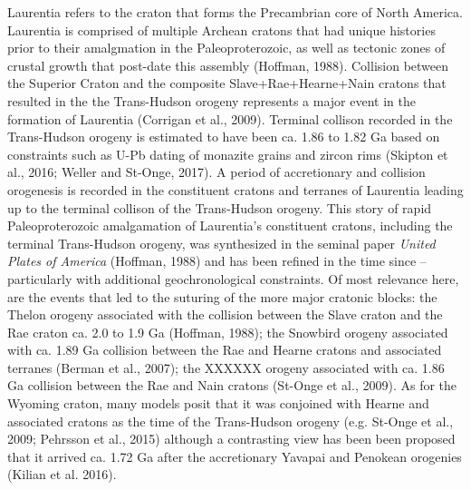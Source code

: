 \documentclass[11pt,letterpaper]{article}
\begin{document}
Laurentia refers to the craton that forms the Precambrian core of North America. Laurentia is comprised of multiple Archean cratons that had unique histories prior to their amalgmation in the Paleoproterozoic, as well as tectonic zones of crustal growth that post-date this assembly (Hoffman, 1988). Collision between the Superior Craton and the composite Slave+Rae+Hearne+Nain cratons that resulted in the the Trans-Hudson orogeny represents a major event in the formation of Laurentia (Corrigan et al., 2009). Terminal collison recorded in the Trans-Hudson orogeny is estimated to have been ca. 1.86 to 1.82 Ga based on constraints such as U-Pb dating of monazite grains and zircon rims (Skipton et al., 2016; Weller and St-Onge, 2017). A period of accretionary and collision orogenesis is recorded in the constituent cratons and terranes of Laurentia leading up to the terminal collison of the Trans-Hudson orogeny. This story of rapid Paleoproterozoic amalgamation of  Laurentia's constituent cratons, including the terminal Trans-Hudson orogeny, was synthesized in the seminal paper \textit{United Plates of America} (Hoffman, 1988) and has been refined in the time since -- particularly with additional geochronological constraints. Of most relevance here, are the events that led to the suturing of the more major cratonic blocks: the Thelon orogeny associated with the collision between the Slave craton and the Rae craton ca. 2.0 to 1.9 Ga (Hoffman, 1988); the Snowbird orogeny associated with ca. 1.89 Ga collision between the Rae and Hearne cratons and associated terranes (Berman et al., 2007); the XXXXXX orogeny associated with ca. 1.86 Ga collision between the Rae and Nain cratons (St-Onge et al., 2009). As for the Wyoming craton, many models posit that it was conjoined with Hearne and associated cratons as the time of the Trans-Hudson orogeny (e.g. St-Onge et al., 2009; Pehrsson et al., 2015) although a contrasting view has been been proposed that it arrived ca. 1.72 Ga after the accretionary Yavapai and Penokean orogenies (Kilian et al. 2016).  
\end{document}
